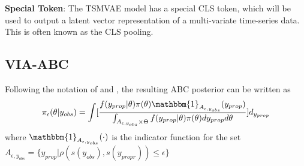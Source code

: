 \documentclass[12pt]{article} %
\begin{document}
%
%
%
%


\textbf{Special Token}: The TSMVAE model has a special CLS token, which will be used to output a latent vector representation of a multi-variate time-series data. This is often known as the CLS pooling. 



\subsection{VIA-ABC}
Following the notation of \citep{marin2012approximate} and \citep{simola2021adaptive}, the resulting ABC posterior can be written as
$$
\pi_{\epsilon}(\theta | y_{obs}) = \int [\frac{f(y_{prop} | \theta)\pi(\theta)\mathbbm{1}_{A_{\epsilon, y_{obs}}}(y_{prop})}{\int_{A_{\epsilon, y_{obs}} \times \Theta } f(y_{prop} | \theta)\pi(\theta)dy_{prop}d\theta}]d_{y_{prop}}
$$
where $\mathbbm{1}_{A_{\epsilon, y_{obs}}}(\cdot)$ is the indicator function for the set $A_{\epsilon, y_{obs}} = \{y_{prop} | \rho (s(y_{obs}), s(y_{propr})) \leq \epsilon\}$
\end{document}
